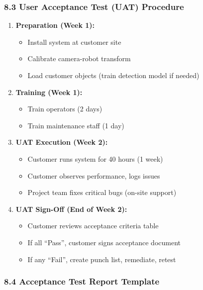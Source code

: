 \documentclass[
]{article}
\providecommand{\tightlist}{%
  \setlength{\itemsep}{0pt}\setlength{\parskip}{0pt}}
\begin{document}
\hypertarget{user-acceptance-test-uat-procedure}{%
\subsubsection{8.3 User Acceptance Test (UAT)
Procedure}\label{user-acceptance-test-uat-procedure}}

\begin{enumerate}
\def\labelenumi{\arabic{enumi}.}
\tightlist
\item
  \textbf{Preparation (Week 1):}

  \begin{itemize}
  \tightlist
  \item
    Install system at customer site
  \item
    Calibrate camera-robot transform
  \item
    Load customer objects (train detection model if needed)
  \end{itemize}
\item
  \textbf{Training (Week 1):}

  \begin{itemize}
  \tightlist
  \item
    Train operators (2 days)
  \item
    Train maintenance staff (1 day)
  \end{itemize}
\item
  \textbf{UAT Execution (Week 2):}

  \begin{itemize}
  \tightlist
  \item
    Customer runs system for 40 hours (1 week)
  \item
    Customer observes performance, logs issues
  \item
    Project team fixes critical bugs (on-site support)
  \end{itemize}
\item
  \textbf{UAT Sign-Off (End of Week 2):}

  \begin{itemize}
  \tightlist
  \item
    Customer reviews acceptance criteria table
  \item
    If all ``Pass'', customer signs acceptance document
  \item
    If any ``Fail'', create punch list, remediate, retest
  \end{itemize}
\end{enumerate}

\hypertarget{acceptance-test-report-template}{%
\subsubsection{8.4 Acceptance Test Report
Template}\label{acceptance-test-report-template}}
\end{document}
